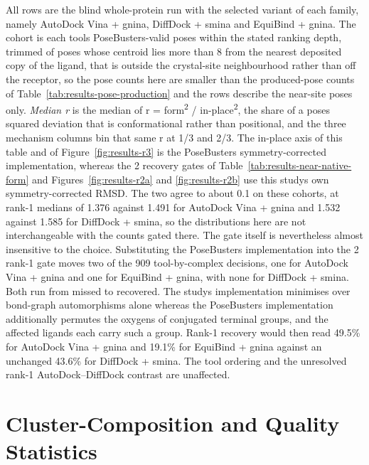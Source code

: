 \begin{longtable}[]
{All rows are the blind whole-protein run with the selected variant of each family, namely AutoDock Vina + gnina, DiffDock + smina and EquiBind + gnina. The cohort is each tool\textquotesingle s PoseBusters-valid poses within the stated ranking depth, trimmed of poses whose centroid lies more than 8\angstrom{} from the nearest deposited copy of the ligand, that is outside the crystal-site neighbourhood rather than off the receptor, so the pose counts here are smaller than the produced-pose counts of Table~\ref{tab:results-pose-production} and the rows describe the near-site poses only. \emph{Median r} is the median of r = form\textsuperscript{2} / in-place\textsuperscript{2}, the share of a pose\textquotesingle s squared deviation that is conformational rather than positional, and the three mechanism columns bin that same r at 1/3 and 2/3. The in-place axis of this table and of Figure~\ref{fig:results-r3} is the PoseBusters symmetry-corrected implementation, whereas the 2\angstrom{} recovery gates of Table~\ref{tab:results-near-native-form} and Figures~\ref{fig:results-r2a} and \ref{fig:results-r2b} use this study\textquotesingle s own symmetry-corrected RMSD. The two agree to about 0.1\angstrom{} on these cohorts, at rank-1 medians of 1.376 against 1.491\angstrom{} for AutoDock Vina + gnina and 1.532 against 1.585\angstrom{} for DiffDock + smina, so the distributions here are not interchangeable with the counts gated there. The gate itself is nevertheless almost insensitive to the choice. Substituting the PoseBusters implementation into the 2\angstrom{} rank-1 gate moves two of the 909 tool-by-complex decisions, one for AutoDock Vina + gnina and one for EquiBind + gnina, with none for DiffDock + smina. Both run from missed to recovered. The study\textquotesingle s implementation minimises over bond-graph automorphisms alone whereas the PoseBusters implementation additionally permutes the oxygens of conjugated terminal groups, and the affected ligands each carry such a group. Rank-1 recovery would then read 49.5\% for AutoDock Vina + gnina and 19.1\% for EquiBind + gnina against an unchanged 43.6\% for DiffDock + smina. The tool ordering and the unresolved rank-1 AutoDock--DiffDock contrast are unaffected.} \\
\end{longtable}
\endgroup

\hypertarget{cluster-composition-statistics}{%
\section{Cluster-Composition and Quality Statistics}\label{cluster-composition-statistics}}

